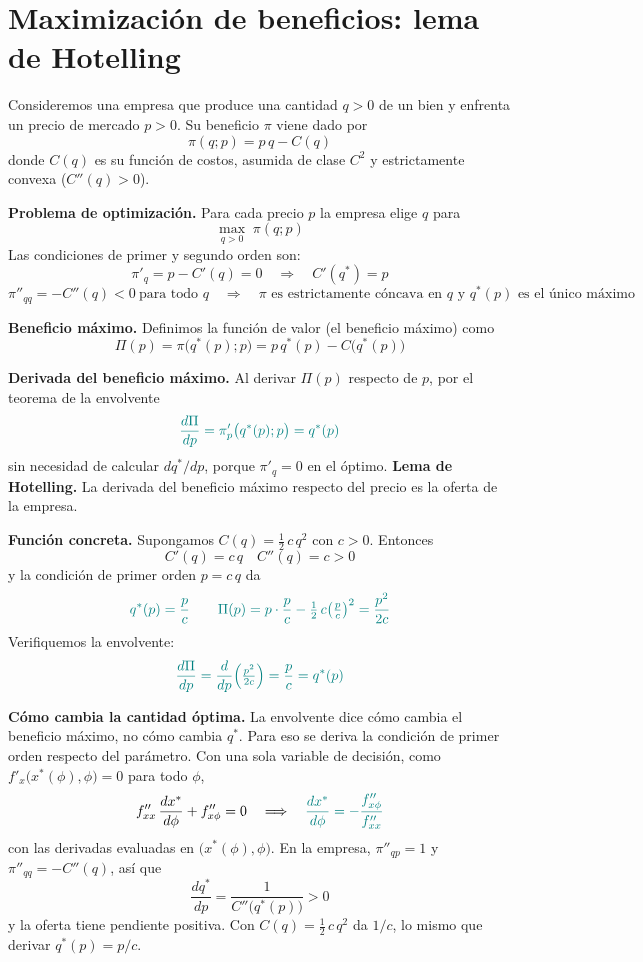 \documentclass{article}
\begin{document}
\section*{Maximización de beneficios: lema de Hotelling}

Consideremos una empresa que produce una cantidad \(q>0\) de un bien y enfrenta un precio de mercado \(p>0\). Su beneficio \(\pi\) viene dado por
\[
\pi(q;p)=p\,q-C(q)
\]
donde \(C(q)\) es su función de costos, asumida de clase \(C^2\) y estrictamente convexa (\(C''(q)>0\)).

\textbf{Problema de optimización.} Para cada precio \(p\) la empresa elige \(q\) para
\[
\max_{q>0}\;\pi(q;p)
\]
Las condiciones de primer y segundo orden son:
\[
\pi'_q=p-C'(q)=0
\quad\Longrightarrow\quad
C'(q^*)=p
\]
\[
\pi''_{qq}=-C''(q)<0\ \text{para todo } q
\quad\Longrightarrow\quad
\text{\(\pi\) es estrictamente cóncava en \(q\) y \(q^*(p)\) es el único máximo}
\]

\textbf{Beneficio máximo.} Definimos la función de valor (el beneficio máximo) como
\[
\Pi(p)=\pi\bigl(q^*(p);p\bigr)=p\,q^*(p)-C\bigl(q^*(p)\bigr)
\]

\textbf{Derivada del beneficio máximo.} Al derivar \(\Pi(p)\) respecto de \(p\), por el teorema de la envolvente
\[
\color{teal}
\frac{d\Pi}{dp}=\pi'_p\bigl(q^*(p);p\bigr)=q^*(p)
\]
sin necesidad de calcular \(dq^*/dp\), porque \(\pi'_q=0\) en el óptimo. {\color{teal}\textbf{Lema de Hotelling.}} La derivada del beneficio máximo respecto del precio es la oferta de la empresa.

\textbf{Función concreta.} Supongamos \(C(q)=\tfrac12\,c\,q^2\) con \(c>0\). Entonces
\[
C'(q)=c\,q\quad C''(q)=c>0
\]
y la condición de primer orden \(p=c\,q\) da
\[\color{teal}
q^*(p)=\frac{p}{c}\qquad \Pi(p)=p\cdot\frac{p}{c}-\tfrac12\,c\bigl(\tfrac{p}{c}\bigr)^2
=\frac{p^2}{2c}
\]
Verifiquemos la envolvente:
\[\color{teal}
\frac{d\Pi}{dp}
=\frac{d}{dp}\Bigl(\tfrac{p^2}{2c}\Bigr)
=\frac{p}{c}
=q^*(p)
\]

\textbf{Cómo cambia la cantidad óptima.} La envolvente dice cómo cambia el beneficio máximo, no cómo cambia \(q^*\). Para eso se deriva la condición de primer orden respecto del parámetro. Con una sola variable de decisión, como \(f'_x\bigl(x^*(\phi),\phi\bigr)=0\) para todo \(\phi\),
\[
f''_{xx}\,\frac{dx^*}{d\phi}+f''_{x\phi}=0
\quad\Longrightarrow\quad
{\color{teal}\frac{dx^*}{d\phi}=-\frac{f''_{x\phi}}{f''_{xx}}}
\]
con las derivadas evaluadas en \(\bigl(x^*(\phi),\phi\bigr)\). En la empresa, \(\pi''_{qp}=1\) y \(\pi''_{qq}=-C''(q)\), así que
\[
\frac{dq^*}{dp}=\frac{1}{C''\bigl(q^*(p)\bigr)}>0
\]
y la oferta tiene pendiente positiva. Con \(C(q)=\tfrac12\,c\,q^2\) da \(1/c\), lo mismo que derivar \(q^*(p)=p/c\).
\end{document}

